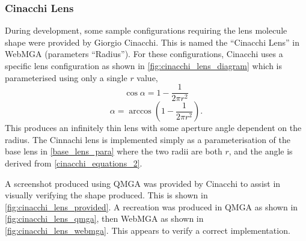 \subsubsection{Cinacchi Lens}
During development, some sample configurations requiring the lens molecule shape were provided by Giorgio Cinacchi. This is named the ``Cinacchi Lens'' in WebMGA (parameters ``Radius''). For these configurations, Cinacchi uses a specific lens configuration as shown in \cref{fig:cinacchi_lens_diagram} which is parameterised using only a single $r$ value,
\begin{equation}
\cos\alpha=1-\frac{1}{2\pi r^2}
\label{cinacchi_equations_1}
\end{equation}
\begin{equation}
\alpha=\arccos\left(1-\frac{1}{2\pi r^2}\right).
\label{cinacchi_equations_2}
\end{equation}
This produces an infinitely thin lens with some aperture angle dependent on the radius. The Cinnachi lens is implemented simply as a parameterisation of the base lens in \cref{base_lens_para} where the two radii are both $r$, and the angle is derived from \cref{cinacchi_equations_2}.

A screenshot produced using QMGA was provided by Cinacchi to assist in visually verifying the shape produced. This is shown in \cref{fig:cinacchi_lens_provided}. A recreation was produced in QMGA as shown in \cref{fig:cinacchi_lens_qmga}, then WebMGA as shown in \cref{fig:cinacchi_lens_webmga}. This appears to verify a correct implementation.

